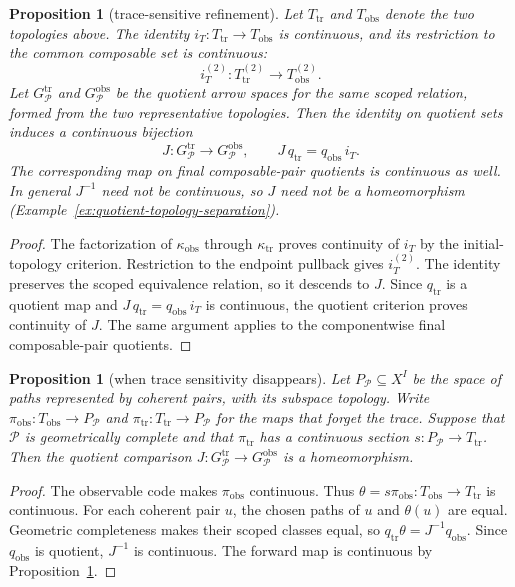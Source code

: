 \documentclass[10pt,reqno]{amsart}
\theoremstyle{definition}
\theoremstyle{plain}
\newtheorem{proposition}[definition]{Proposition}
\theoremstyle{remark}
\begin{document}
\begin{proposition}[trace-sensitive refinement]
\label{prop:trace-sensitive-refinement}
Let $T_{\mathrm{tr}}$ and $T_{\mathrm{obs}}$ denote the two topologies above.
The identity $i_T:T_{\mathrm{tr}}\to T_{\mathrm{obs}}$ is continuous, and its
restriction to the common composable set is continuous:
\[
  i_T^{(2)}:T_{\mathrm{tr}}^{(2)}\longrightarrow T_{\mathrm{obs}}^{(2)}.
\]
Let $G_{\mathcal P}^{\mathrm{tr}}$ and $G_{\mathcal P}^{\mathrm{obs}}$ be
the quotient arrow spaces for the same scoped relation, formed from the two
representative topologies.  Then the identity on quotient sets induces a
continuous bijection
\[
  J:G_{\mathcal P}^{\mathrm{tr}}\longrightarrow G_{\mathcal P}^{\mathrm{obs}},
  \qquad J\,q_{\mathrm{tr}}=q_{\mathrm{obs}}\,i_T.
\]
The corresponding map on final composable-pair quotients is continuous as
well.  In general $J^{-1}$ need not be continuous, so $J$ need not be a
homeomorphism (Example~\ref{ex:quotient-topology-separation}).
\end{proposition}

\begin{proof}
The factorization of $\kappa_{\mathrm{obs}}$ through $\kappa_{\mathrm{tr}}$
proves continuity of $i_T$ by the initial-topology criterion.  Restriction to
the endpoint pullback gives $i_T^{(2)}$.  The identity preserves the scoped
equivalence relation, so it descends to $J$.  Since
$q_{\mathrm{tr}}$ is a quotient map and
$J\,q_{\mathrm{tr}}=q_{\mathrm{obs}}\,i_T$ is continuous, the quotient
criterion proves continuity of $J$.  The same argument applies to the
componentwise final composable-pair quotients.
\end{proof}

\begin{proposition}[when trace sensitivity disappears]
\label{prop:trace-collapse-section}
Let $P_{\mathcal P}\subseteq X^I$ be the space of paths represented by
coherent pairs, with its subspace topology.  Write
$\pi_{\mathrm{obs}}:T_{\mathrm{obs}}\to P_{\mathcal P}$ and
$\pi_{\mathrm{tr}}:T_{\mathrm{tr}}\to P_{\mathcal P}$ for the maps that
forget the trace.  Suppose that $\mathcal P$ is geometrically complete and
that $\pi_{\mathrm{tr}}$ has a continuous section
$s:P_{\mathcal P}\to T_{\mathrm{tr}}$.  Then the quotient comparison
$J:G_{\mathcal P}^{\mathrm{tr}}\to G_{\mathcal P}^{\mathrm{obs}}$ is a
homeomorphism.
\end{proposition}

\begin{proof}
The observable code makes $\pi_{\mathrm{obs}}$ continuous.  Thus
$\theta=s\pi_{\mathrm{obs}}:T_{\mathrm{obs}}\to T_{\mathrm{tr}}$ is
continuous.  For each coherent pair $u$, the chosen paths of $u$ and
$\theta(u)$ are equal.  Geometric completeness makes their scoped classes
equal, so $q_{\mathrm{tr}}\theta=J^{-1}q_{\mathrm{obs}}$.  Since
$q_{\mathrm{obs}}$ is quotient, $J^{-1}$ is continuous.  The forward map
is continuous by Proposition~\ref{prop:trace-sensitive-refinement}.
\end{proof}
\end{document}
